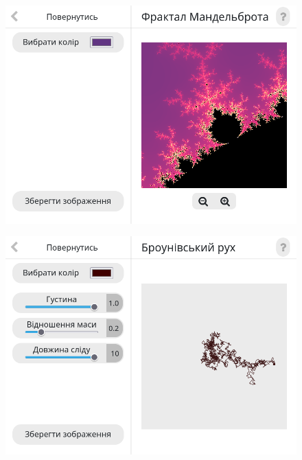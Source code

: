 \documentclass[oneside,14pt]{extarticle}
\begin{document}
\begin{normalsize}
	\begin{figure}[H]
		\centering
		\includegraphics[scale=0.6]{12}
		\caption{}
	\end{figure}
	
	\begin{figure}[H]
		\centering
		\includegraphics[scale=0.6]{21}
		\caption{}
	\end{figure}
	

\end{normalsize}
\end{document}
